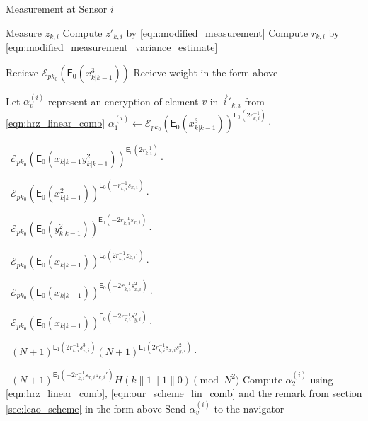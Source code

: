 \documentclass[10pt,letterpaper,oneside,twocolumn,journal]{IEEEtran}
\theoremstyle{definition}
\theoremstyle{definition}
\theoremstyle{remark}
\begin{document}
\begin{algorithm}[htbp]
\caption{Measurement at Sensor $i$}\label{alg:measurement_info}
\begin{algorithmic}[1]

    \State Measure $z_{k,i}$
    \State Compute $z'_{k,i}$ by \eqref{eqn:modified_measurement}
    \State Compute $r_{k,i}$ by \eqref{eqn:modified_measurement_variance_estimate}

    \State Recieve $\mathcal{E}_{pk_0}(\mathsf{E}_{0}(x^3_{k|k-1}))$
        \State Recieve weight in the form above
    \EndFor

    \State Let $\alpha_{v}^{(i)}$ represent an encryption of element $v$ in $\vec{i}'_{k,i}$ from \eqref{eqn:hrz_linear_comb}
    \State $\alpha_{1}^{(i)} \gets \mathcal{E}_{pk_0}(\mathsf{E}_{0}(x^3_{k|k-1}))^{\mathsf{E}_{0}(2r_{k,i}^{-1})}\cdot$\par
    \ $\mathcal{E}_{pk_0}(\mathsf{E}_{0}(x_{k|k-1}y^2_{k|k-1}))^{\mathsf{E}_{0}(2r_{k,i}^{-1})}\cdot$\par
    \ $\mathcal{E}_{pk_0}(\mathsf{E}_{0}(x^2_{k|k-1}))^{\mathsf{E}_{0}(-r_{k, i}^{-1}s_{x,i})}\cdot$\par
    \ $\mathcal{E}_{pk_0}(\mathsf{E}_{0}(y^2_{k|k-1}))^{\mathsf{E}_{0}(-2r_{k, i}^{-1}s_{x,i})}\cdot$\par
    \ $\mathcal{E}_{pk_0}(\mathsf{E}_{0}(x_{k|k-1}))^{\mathsf{E}_{0}(2r_{k,i}^{-1}z_{k,i}')}\cdot$\par
    \ $\mathcal{E}_{pk_0}(\mathsf{E}_{0}(x_{k|k-1}))^{\mathsf{E}_{0}(-2r_{k,i}^{-1}s_{x,i}^2)}\cdot$\par
    \ $\mathcal{E}_{pk_0}(\mathsf{E}_{0}(x_{k|k-1}))^{\mathsf{E}_{0}(-2r_{k,i}^{-1}s_{y,i}^2)}\cdot$\par
    \ $(N+1)^{\mathsf{E}_{1}(2r_{k,i}^{-1}s_{x,i}^3)}
    (N+1)^{\mathsf{E}_{1}(2r_{k,i}^{-1}s_{x,i}s_{y,i}^2)}\cdot$\par
    \ $(N+1)^{\mathsf{E}_{1}(-2r_{k, i}^{-1}s_{x,i}z_{k,i}')}
    H(k\mathbin\|1\mathbin\|1\mathbin\|0)\pmod{N^2}$
    \State Compute $\alpha_{2}^{(i)}$ using \eqref{eqn:hrz_linear_comb}, \eqref{eqn:our_scheme_lin_comb} and the remark from section \ref{sec:lcao_scheme} in the form above
        \State Send $\alpha_{v}^{(i)}$ to the navigator
    \EndFor


\end{algorithmic}
\end{algorithm}
\end{document}
